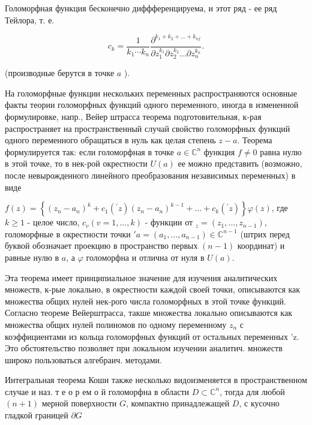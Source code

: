 \documentclass[10pt]{article}
\begin{document}
Голоморфная функция бесконечно диффференцируема, и этот ряд - ее ряд Тейлора, т. е.



\[

c_{k}=\frac{1}{k_{1} \cdots k_{n}} \frac{\partial^{k_{1}+k_{2}+\ldots+k_{n f}}}{\partial z_{1}^{k_{1}} \partial z_{2}^{k_{2}} \ldots \partial z_{n}^{k_{n}}} .

\]



(производные берутся в точке $a$ ).



На голоморфные функции нескольких переменных распространяются основные факты теории голоморфных функций одного переменного, иногда в измененной формулировке, напр., Вейер штрасса теорема подготовительная, к-рая распространяет на пространственный случай свойство голоморфных функций одного переменного обращаться в нуль как целая степень $z-a$. Теорема формулируется так: если голоморфная в точке $a \in \mathbb{C}^{n}$ функция $f \neq 0$ равна нулю в этой точке, то в нек-рой окрестности $U(a)$ ее можно представить (возможно, после невырожденного линейного преобразования независимых переменных) в виде



$f(z)=\left\{\left(z_{n}-a_{n}\right)^{k}+c_{1}\left({ }^{\prime} z\right)\left(z_{n}-a_{n}\right)^{k-1}+\ldots+c_{k}\left({ }^{\prime} z\right)\right\} \varphi(z)$, где $k \geqslant 1$ - целое число, $c_{v}(v=1, \ldots, k)$ - функции от ${ }_{z}=\left(z_{1}, \ldots, z_{n-1}\right)$, голоморфные в окрестности точки $' a=\left(a_{1}, \ldots, a_{n-1}\right) \in \mathbb{C}^{n-1}$ (штрих перед буквой обозначает проекцию в пространство первых $(n-1)$ координат) и равные нулю в $a$, а $\varphi$ голоморфна и отлична от нуля в $U(a)$.



Эта теорема имеет принципиальное значение для изучения аналитических множеств, к-рые локально, в окрестности каждой своей точки, описываются как множества общих нулей нек-рого числа голоморфных в этой точке функций. Согласно теореме Вейерштрасса, такше множества локально описываются как множества общих нулей полиномов по одному переменному $z_{n}$ с коэффициентами из кольца голоморфных функций от остальных переменных 'z. Это обстоятельство позволяет при локальном изучении аналитич. множеств широко пользоваться алгебраич. методами.



Интегральная теорема Коши также несколько видоизменяется в пространственном случае и наз. т е о р ем о й голоморфна в области $D \subset \mathbb{C}^{n}$, тогда для любой $(n+1)$ мерной поверхности $G$, компактно принадлежащей $D$, с кусочно гладкой границей $\partial G$
\end{document}
